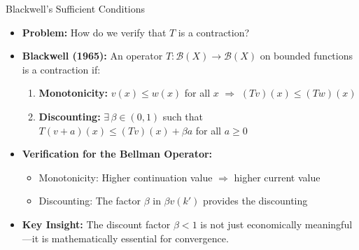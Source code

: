 \documentclass[10pt,english,aspectratio=169]{beamer}
\begin{document}
\begin{frame}{Blackwell's Sufficient Conditions}
\begin{itemize}
\item \textbf{Problem:} How do we verify that $T$ is a contraction?

\medskip
\item \textbf{Blackwell (1965):} An operator $T: \mathcal{B}(X) \to \mathcal{B}(X)$ on bounded functions is a contraction if:
\begin{enumerate}
    \item \textbf{Monotonicity:} $v(x) \leq w(x)$ for all $x$ $\Rightarrow$ $(Tv)(x) \leq (Tw)(x)$
    \item \textbf{Discounting:} $\exists\, \beta \in (0,1)$ such that $T(v + a)(x) \leq (Tv)(x) + \beta a$ for all $a \geq 0$
\end{enumerate}

\medskip
\item \textbf{Verification for the Bellman Operator:}
\begin{itemize}
    \item Monotonicity: Higher continuation value $\Rightarrow$ higher current value
    \item Discounting: The factor $\beta$ in $\beta v(k')$ provides the discounting
\end{itemize}

\medskip
\item \textbf{Key Insight:} The discount factor $\beta < 1$ is not just economically meaningful---it is mathematically essential for convergence.
\end{itemize}
\end{frame}
\end{document}
